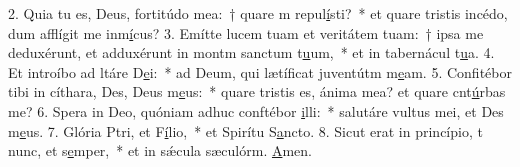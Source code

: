 2. Quia tu es, Deus, fortitúdo mea:~† quare m repul\uline{í}sti?~* et quare tristis incédo, dum afflígit me inm\uline{í}cus?
3. Emítte lucem tuam et veritátem tuam:~† ipsa me deduxérunt, et adduxérunt in montm sanctum t\uline{u}um,~* et in tabernácul t\uline{u}a.
4. Et introíbo ad ltáre D\uline{e}i:~* ad Deum, qui lætíficat juventútm m\uline{e}am.
5. Confitébor tibi in cíthara, Des, Deus m\uline{e}us:~* quare tristis es, ánima mea? et quare cnt\uline{ú}rbas me?
6. Spera in Deo, quóniam adhuc conftébor \uline{i}lli:~* salutáre vultus mei, et Des m\uline{e}us.
7. Glória Ptri, et F\uline{í}lio,~* et Spirítu S\uline{a}ncto.
8. Sicut erat in princípio, t nunc, et s\uline{e}mper,~* et in sǽcula sæculórm. \uline{A}men.
